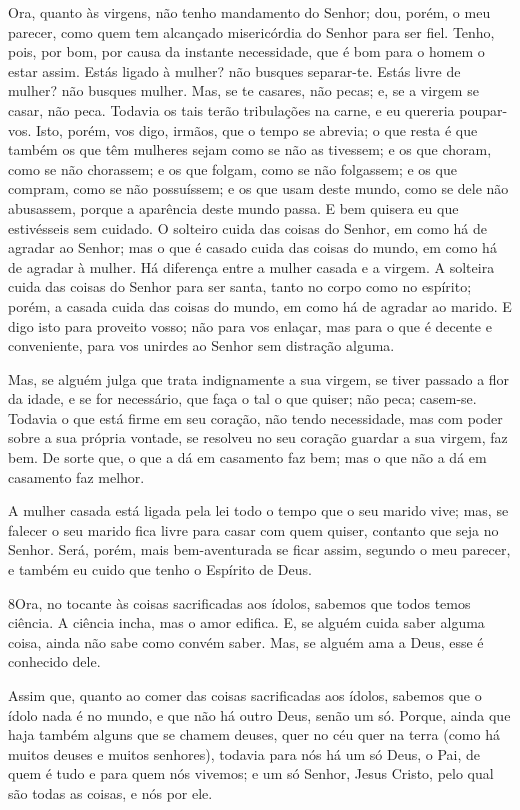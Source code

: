 Ora, quanto às virgens, não tenho mandamento do Senhor; dou,
porém, o meu parecer, como quem tem alcançado misericórdia do Senhor
para ser fiel. Tenho, pois, por bom, por causa da instante
necessidade, que é bom para o homem o estar assim. Estás
ligado à mulher? não busques separar-te. Estás livre de mulher? não
busques mulher. Mas, se te casares, não pecas; e, se a virgem
se casar, não peca. Todavia os tais terão tribulações na carne, e eu
quereria poupar-vos. Isto, porém, vos digo, irmãos, que o
tempo se abrevia; o que resta é que também os que têm mulheres sejam
como se não as tivessem; e os que choram, como se não
chorassem; e os que folgam, como se não folgassem; e os que compram,
como se não possuíssem; e os que usam deste mundo, como se
dele não abusassem, porque a aparência deste mundo passa. E
bem quisera eu que estivésseis sem cuidado. O solteiro cuida das
coisas do Senhor, em como há de agradar ao Senhor; mas o que
é casado cuida das coisas do mundo, em como há de agradar à mulher.
Há diferença entre a mulher casada e a virgem. A solteira
cuida das coisas do Senhor para ser santa, tanto no corpo como no
espírito; porém, a casada cuida das coisas do mundo, em como há de
agradar ao marido. E digo isto para proveito vosso; não para
vos enlaçar, mas para o que é decente e conveniente, para vos
unirdes ao Senhor sem distração alguma.

Mas, se alguém julga que trata indignamente a sua virgem, se
tiver passado a flor da idade, e se for necessário, que faça o tal o
que quiser; não peca; casem-se. Todavia o que está firme em
seu coração, não tendo necessidade, mas com poder sobre a sua
própria vontade, se resolveu no seu coração guardar a sua virgem,
faz bem. De sorte que, o que a dá em casamento faz bem; mas o
que não a dá em casamento faz melhor.

A mulher casada está ligada pela lei todo o tempo que o seu
marido vive; mas, se falecer o seu marido fica livre para casar com
quem quiser, contanto que seja no Senhor. Será, porém, mais
bem-aventurada se ficar assim, segundo o meu parecer, e também eu
cuido que tenho o Espírito de Deus.

\medskip

\lettrine{8} Ora, no tocante às coisas sacrificadas aos
ídolos, sabemos que todos temos ciência. A ciência incha, mas o amor
edifica. E, se alguém cuida saber alguma coisa, ainda não sabe
como convém saber. Mas, se alguém ama a Deus, esse é conhecido
dele.

Assim que, quanto ao comer das coisas sacrificadas aos ídolos,
sabemos que o ídolo nada é no mundo, e que não há outro Deus, senão
um só. Porque, ainda que haja também alguns que se chamem
deuses, quer no céu quer na terra (como há muitos deuses e muitos
senhores), todavia para nós há um só Deus, o Pai, de quem é tudo
e para quem nós vivemos; e um só Senhor, Jesus Cristo, pelo qual são
todas as coisas, e nós por ele.

